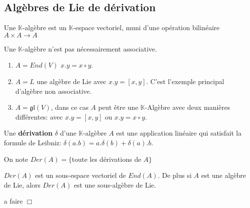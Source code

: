 \documentclass[a4paper,openany,12pt]{report}
\newcommand{\KK}{\mathbb{K}}
\newcommand{\gl}{\mathfrak{gl}}
\theoremstyle{break}
{\theorembodyfont{\upshape}
\newtheorem*{rmq}{Remarque :}
\newtheorem*{prv}{Preuve :}
\newtheorem*{ex}{Exemples :}
\newtheorem*{exe}{Exemple : }
\newtheorem*{nota}{Notation :}
\newtheorem*{dem}{D\'emonstration :}}
\begin{document}
\subsection{Algèbres de Lie de  dérivation}
 
\begin{df}
\quad Une $\KK$-algèbre est un $\KK$-espace vectoriel, muni d'une opération bilinéaire $A \times A \to  A$
\end{df}

\begin{rmq}
Une $\KK$-algèbre n'est pas nécessairement associative.
\end{rmq}

\begin{ex}
\begin{enumerate}
\item $A=End(V)$ \quad $x.y=x\circ y$.

\item $A=L$ une algèbre de Lie avec $x. y= [x,y]$. C'est l'exemple principal d'algèbre non associative.

\item $A=\gl(V)$, dans ce cas $A$ peut être une $\KK$-Algèbre avec deux manières différentes: avec $x. y= [x,y]$ ou  $x.y=x\circ y$.
\end{enumerate}
\end{ex}

\begin{df}
\quad Une \textbf{dérivation} $\delta$ d'une $\KK$-algèbre $A$ est une application linéaire qui satisfait la formule de Leibniz:
\center $\delta(a.b)=a.\delta(b)+\delta(a).b$.
\end{df}

\begin{nota}
\quad On note $Der(A)=\{ $toute les dérivations de $A \}$
\end{nota}

\begin{prop}
\quad $Der(A)$ est un sous-espace vectoriel de $End(A)$.
De plus si $A$ est une algèbre de Lie, alors $Der(A)$ est une sous-algèbre de Lie. 
\end{prop}

\begin{prv}
a faire $\Box$
\end{prv}
\end{document}
